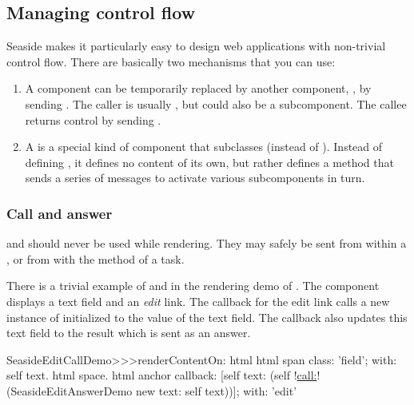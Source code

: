 \documentclass[a4paper,10pt,twoside]{book}
\begin{document}
\subsection{Managing control flow}

Seaside makes it particularly easy to design web applications with non-trivial control flow.
There are basically two mechanisms that you can use:

\begin{enumerate}
  \item A component  can be temporarily replaced by another component, , by sending .
  The caller is usually , but could also be a subcomponent.
  The callee returns control by sending .

  \item A  is a special kind of component that subclasses  (instead of ).
  Instead of defining , it defines no content of its own, but rather defines a  method that sends a series of  messages to activate various subcomponents in turn.
\end{enumerate}

\subsubsection{Call and answer}

 and  should never be used while rendering.
They may safely be sent from within a , or from with the  method of a task.

There is a trivial example of  and  in the rendering demo of .
The component  displays a text field and an \emph{edit} link.
The callback for the edit link calls a new instance of  initialized to the value of the text field.
The callback also updates this text field to the result which is sent as an answer.

\begin{code}{}
SeasideEditCallDemo>>>renderContentOn: html 
	html span
		class: 'field';
		with: self text.
	html space.
	html anchor
		callback: [self text: (self !\underline{call:}! (SeasideEditAnswerDemo new text: self text))];
		with: 'edit'
\end{code}{}
\end{document}
